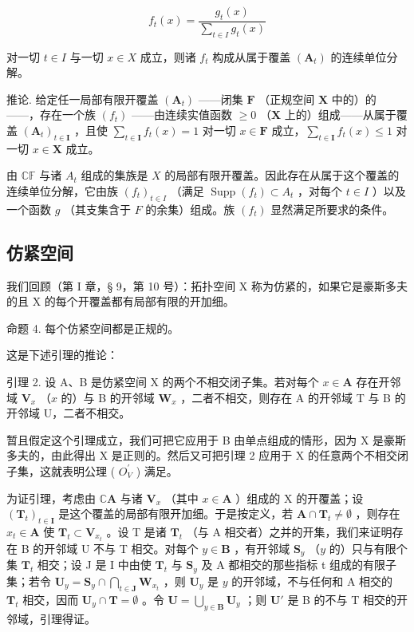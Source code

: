\[
f _ {t} (x) = \frac {g _ {t} (x)}{\sum_ {t \in I} g _ {t} (x)}
\]

对一切 \(t \in I\) 与一切 \(x \in X\) 成立，则诸 \(f_t\) 构成从属于覆盖 \((\mathbf{A}_t)\) 的连续单位分解。

推论. 给定任一局部有限开覆盖 \((\mathbf{A}_t)\) ——闭集 \(\mathbf{F}\) （正规空间 \(\mathbf{X}\) 中的）的——，存在一个族 \((f_t)\) ——由连续实值函数 \(\geqslant 0\) （\(\mathbf{X}\) 上的）组成——从属于覆盖 \((\mathbf{A}_t)_{t \in \mathbf{I}}\) ，且使 \(\sum_{t \in \mathbf{I}} f_t(x) = 1\) 对一切 \(x \in \mathbf{F}\) 成立，\(\sum_{t \in \mathbf{I}} f_t(x) \leqslant 1\) 对一切 \(x \in \mathbf{X}\) 成立。

由 \(\mathbb{CF}\) 与诸 \(A_{t}\) 组成的集族是 \(X\) 的局部有限开覆盖。因此存在从属于这个覆盖的连续单位分解，它由族 \((f_{t})_{t\in I}\) （满足 \(\operatorname{Supp}(f_t)\subset A_t\) ，对每个 \(t\in I\) ）以及一个函数 \(g\) （其支集含于 \(F\) 的余集）组成。族 \((f_{t})\) 显然满足所要求的条件。

\subsection{仿紧空间}

我们回顾（第 I 章，§ 9，第 10 号）：拓扑空间 X 称为仿紧的，如果它是豪斯多夫的且 X 的每个开覆盖都有局部有限的开加细。

命题 4. 每个仿紧空间都是正规的。

这是下述引理的推论：

引理 2. 设 A、B 是仿紧空间 X 的两个不相交闭子集。若对每个 \(x \in \mathbf{A}\) 存在开邻域 \(\mathbf{V}_x\) （\(x\) 的）与 B 的开邻域 \(\mathbf{W}_x\) ，二者不相交，则存在 A 的开邻域 T 与 B 的开邻域 U，二者不相交。

暂且假定这个引理成立，我们可把它应用于 B 由单点组成的情形，因为 X 是豪斯多夫的，由此得出 X 是正则的。然后又可把引理 2 应用于 X 的任意两个不相交闭子集，这就表明公理 ( \(O_{V}^{\prime}\) ) 满足。

为证引理，考虑由 \(\mathbb{C}\mathbf{A}\) 与诸 \(\mathbf{V}_x\) （其中 \(x \in \mathbf{A}\) ）组成的 X 的开覆盖；设 \((\mathbf{T}_t)_{t \in \mathbf{I}}\) 是这个覆盖的局部有限开加细。于是按定义，若 \(\mathbf{A} \cap \mathbf{T}_t \neq \emptyset\) ，则存在 \(x_t \in \mathbf{A}\) 使 \(\mathbf{T}_t \subset \mathbf{V}_{x_t}\) 。设 T 是诸 \(\mathbf{T}_t\) （与 A 相交者）之并的开集，我们来证明存在 B 的开邻域 U 不与 T 相交。对每个 \(y \in \mathbf{B}\) ，有开邻域 \(\mathbf{S}_y\) （\(y\) 的）只与有限个集 \(\mathbf{T}_t\) 相交；设 J 是 I 中由使 \(\mathbf{T}_t\) 与 \(\mathbf{S}_y\) 及 A 都相交的那些指标 t 组成的有限子集；若令 \(\mathbf{U}_y = \mathbf{S}_y \cap \bigcap_{t \in \mathbf{J}} \mathbf{W}_{x_t}\) ，则 \(\mathbf{U}_y\) 是 \(y\) 的开邻域，不与任何和 A 相交的 \(\mathbf{T}_t\) 相交，因而 \(\mathbf{U}_y \cap \mathbf{T} = \emptyset\) 。令 \(\mathbf{U} = \bigcup_{y \in \mathbf{B}} \mathbf{U}_y\) ；则 \(\mathbf{U}'\) 是 B 的不与 T 相交的开邻域，引理得证。

